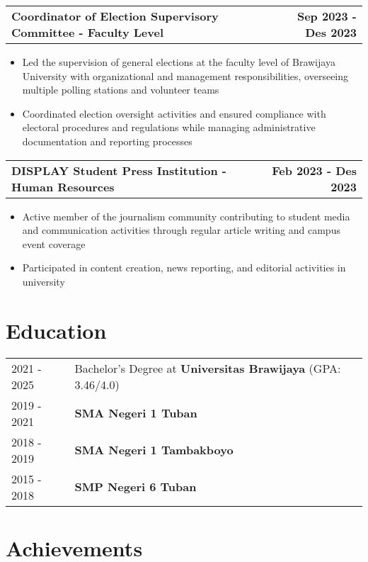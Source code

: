 \documentclass[a4paper,12pt]{article}
\makeatletter
\newenvironment{joblong}[2]
    {
    \begin{tabularx}{\linewidth}{@{}l X r@{}}
    \textbf{#1} & \hfill &  #2 \\[3.75pt]
    \end{tabularx}
    \begin{minipage}[t]{\linewidth}
    \begin{itemize}[nosep,after=\strut, leftmargin=1em, itemsep=3pt,label=--]
    }
    {
    \end{itemize}
    \end{minipage}    
    }
\makeatother
\begin{document}
\begin{joblong}{Coordinator of Election Supervisory Committee - Faculty Level}{\textbf{Sep 2023 - Des 2023}}
\item Led the supervision of general elections at the faculty level of Brawijaya University with organizational and management responsibilities, overseeing multiple polling stations and volunteer teams
\item Coordinated election oversight activities and ensured compliance with electoral procedures and regulations while managing administrative documentation and reporting processes
\end{joblong}

\begin{joblong}{DISPLAY Student Press Institution - Human Resources}{\textbf{Feb 2023 - Des 2023}}
\item Active member of the journalism community contributing to student media and communication activities through regular article writing and campus event coverage
\item Participated in content creation, news reporting, and editorial activities in university
\end{joblong}


\section{Education}
\begin{tabularx}{\linewidth}{@{}l X@{}}
2021 - 2025 & Bachelor's Degree at \textbf{Universitas Brawijaya} \hfill (GPA: 3.46/4.0) \\ 
2019 - 2021 & \textbf{SMA Negeri 1 Tuban} \\
2018 - 2019 & \textbf{SMA Negeri 1 Tambakboyo} \\
2015 - 2018 & \textbf{SMP Negeri 6 Tuban} \\
\end{tabularx}

\section{Achievements}
\end{document}
